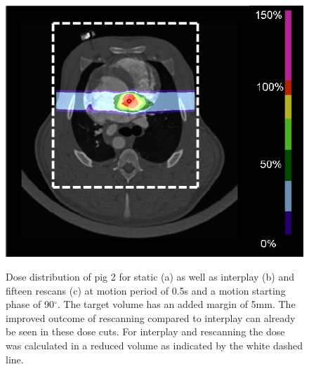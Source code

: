 \documentclass[type=dr, dr=rernat, accentcolor=tud7b,colorbacktitle, bigchapter, openright, twoside, 12pt ]{tudthesis}
\begin{document}
\begin{figure}[H]
\begin{center}
{ \includegraphics[scale=0.56]{Mayo_Pig_L833_contrast_RESCANNING_15x_sin05s90_withLegend.png}
 }
\caption{Dose distribution of pig 2 for static (a) as well as interplay (b) and fifteen rescans (c) at motion period of 0.5s and a motion 
starting phase of 90$^{\circ}$. The target volume has an added margin of 5mm. The improved outcome of rescanning compared to interplay 
can already be seen in these dose cuts. For interplay and rescanning the dose was calculated in a reduced volume as indicated by the white 
dashed line.}
\label{dose_pig2}
 \end{center}
\end{figure}

\newpage
\end{document}
